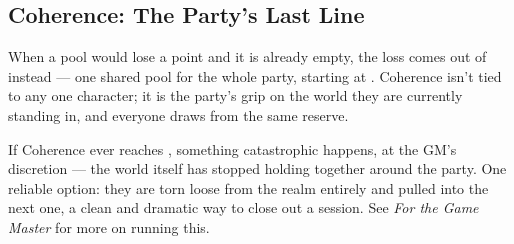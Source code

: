 \subsection*{Coherence: The Party's Last Line}
When a pool would lose a point and it is already empty, the loss comes
out of  instead --- one shared pool for the whole
party, starting at . Coherence isn't tied to any one character;
it is the party's grip on the world they are currently standing in, and
everyone draws from the same reserve.


If Coherence ever reaches , something catastrophic happens, at
the GM's discretion --- the world itself has stopped holding together
around the party. One reliable option: they are torn loose from the
realm entirely and pulled into the next one, a clean and dramatic way to
close out a session. See \emph{For the Game Master} for more on running
this.
